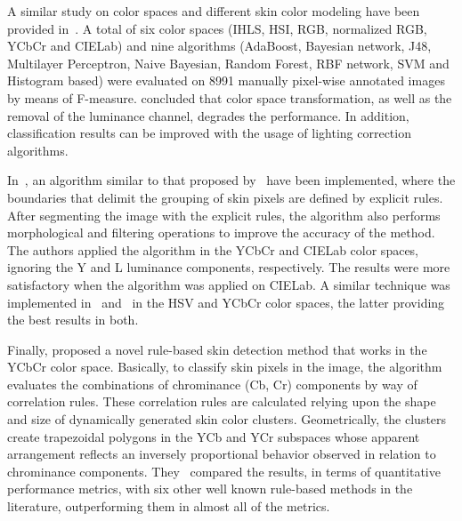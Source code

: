 A similar study on color spaces and different skin color modeling have been provided in~\citet{khan:12}. A total of six color spaces (IHLS, HSI, RGB, normalized RGB, YCbCr and CIELab) and nine algorithms (AdaBoost, Bayesian network, J48, Multilayer Perceptron, Naive Bayesian, Random Forest, RBF network, SVM and Histogram based) were evaluated on 8991 manually pixel-wise annotated images by means of F-measure. \citet{khan:12} concluded that color space transformation, as well as the removal of the luminance channel, degrades the performance. In addition, classification results can be improved with the usage of lighting correction algorithms.

In~\citet{kaur:12}, an algorithm similar to that proposed by~\citet{kovac:03} have been implemented, where the boundaries that delimit the grouping of skin pixels are defined by explicit rules. After segmenting the image with the explicit rules, the algorithm also performs morphological and filtering operations to improve the accuracy of the method. The authors applied the algorithm in the YCbCr and CIELab color spaces, ignoring the Y and L luminance components, respectively. The results were more satisfactory when the algorithm was applied on CIELab. A similar technique was implemented in~\citet{shaik:15} and~\citet{kumar:15} in the HSV and YCbCr color spaces, the latter providing the best results in both.

Finally, \citet{brancati:17} proposed a novel rule-based skin detection method that works in the YCbCr color space. Basically, to classify skin pixels in the image, the algorithm evaluates the combinations of chrominance (Cb, Cr) components by way of correlation rules. These correlation rules are calculated relying upon the shape and size of dynamically generated skin color clusters. Geometrically, the clusters create trapezoidal polygons in the YCb and YCr subspaces whose apparent arrangement reflects an inversely proportional behavior observed in relation to chrominance components. They~\citep{brancati:17} compared the results, in terms of quantitative performance metrics, with six other well known rule-based methods in the literature, outperforming them in almost all of the metrics.